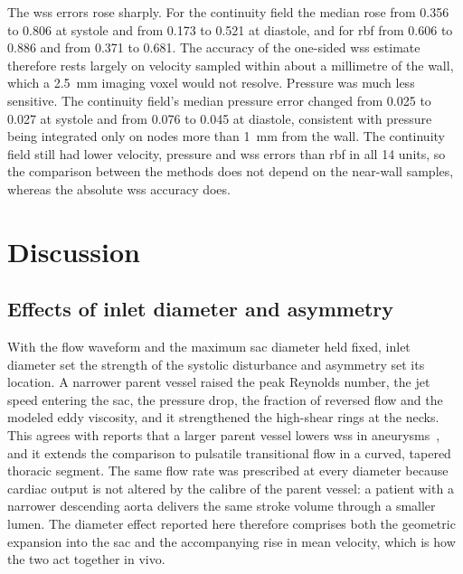 \documentclass[12pt,a4paper]{article}
\newcommand{\WSS}{\ac{wss}\xspace}
\newcommand{\RBF}{\ac{rbf}\xspace}
\theoremstyle{definition}
\numberwithin{equation}{section}
\begin{document}
The \WSS errors rose sharply. For the continuity field the median rose from 0.356 to 0.806 at systole and from 0.173 to 0.521 at diastole, and for \RBF from 0.606 to 0.886 and from 0.371 to 0.681. The accuracy of the one-sided \WSS estimate therefore rests largely on velocity sampled within about a millimetre of the wall, which a 2.5~mm imaging voxel would not resolve. Pressure was much less sensitive. The continuity field's median pressure error changed from 0.025 to 0.027 at systole and from 0.076 to 0.045 at diastole, consistent with pressure being integrated only on nodes more than 1~mm from the wall. The continuity field still had lower velocity, pressure and \WSS errors than \RBF in all 14 units, so the comparison between the methods does not depend on the near-wall samples, whereas the absolute \WSS accuracy does.




\section{Discussion}
\label{sec:discussion}
\subsection{Effects of inlet diameter and asymmetry}
With the flow waveform and the maximum sac diameter held fixed, inlet diameter set the strength of the systolic disturbance and asymmetry set its location. A narrower parent vessel raised the peak Reynolds number, the jet speed entering the sac, the pressure drop, the fraction of reversed flow and the modeled eddy viscosity, and it strengthened the high-shear rings at the necks. This agrees with reports that a larger parent vessel lowers \WSS in aneurysms~\cite{fattahi2023influence}, and it extends the comparison to pulsatile transitional flow in a curved, tapered thoracic segment. The same flow rate was prescribed at every diameter because cardiac output is not altered by the calibre of the parent vessel: a patient with a narrower descending aorta delivers the same stroke volume through a smaller lumen. The diameter effect reported here therefore comprises both the geometric expansion into the sac and the accompanying rise in mean velocity, which is how the two act together in vivo.
\end{document}
